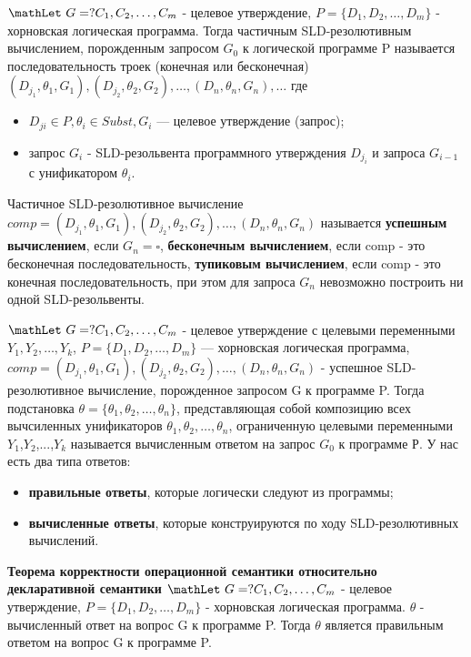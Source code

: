$\mathLet ~ G = ? C_{1},C_{2},\ldots,C_{m}$ - целевое утверждение, $P = \{D_{1},D_{2},\ldots,D_{m}\}$ - хорновская логическая программа. Тогда частичным SLD-резолютивным вычислением, порожденным запросом $G_{0}$ к логической программе P называется последовательность троек (конечная или бесконечная)\\
$(D_{j_{1}}, \theta_{1}, G_{1}), (D_{j_{2}}, \theta_{2}, G_{2}), \ldots, (D_{n}, \theta_{n}, G_{n}), \ldots$
где 
\begin{itemize}
    \item $D_{ji} \in P, \theta_{i} \in Subst, G_{i}$ — целевое утверждение (запрос);
    \item запрос $G_{i}$ - SLD-резольвента программного утверждения $D_{j_{i}}$ и запроса $G_{i-1}$ с унификатором $\theta_{i}$. 
\end{itemize}
Частичное SLD-резолютивное вычисление \\
$comp = (D_{j_{1}}, \theta_{1}, G_{1}), (D_{j_{2}}, \theta_{2}, G_{2}), \ldots, (D_{n}, \theta_{n}, G_{n})$ называется \textbf{успешным вычислением}, если $G_{n} =\square$, \textbf{бесконечным вычислением}, если comp - это бесконечная последовательность, \textbf{тупиковым вычислением}, если comp - это конечная последовательность, при этом для запроса $G_{n}$ невозможно построить ни одной SLD-резольвенты. 

$\mathLet ~ G = ? C_{1},C_{2},\ldots,C_{m}$ - целевое утверждение с целевыми переменными $Y_{1},Y_{2},\ldots,Y_{k}$, $P = \{D_{1},D_{2},\ldots,D_{m}\}$ --- хорновская логическая программа, $comp = (D_{j_{1}}, \theta_{1}, G_{1}), (D_{j_{2}}, \theta_{2}, G_{2}), \ldots, (D_{n}, \theta_{n}, G_{n})$ - успешное SLD-резолютивное вычисление, порожденное запросом G к программе P. Тогда подстановка $\theta = \{\theta_{1},\theta_{2},\ldots,\theta_{n}\}$, представляющая собой композицию всех вычсиленных унификаторов $\theta_{1},\theta_{2},\ldots,\theta_{n}$, ограниченную целевыми переменными $Y_{1}$,$Y_{2}$,...,$Y_{k}$ называется вычисленным ответом на запрос $G_{0}$ к программе Р. 
У нас есть два типа ответов: 
\begin{itemize}
    \item \textbf{правильные ответы}, которые логически следуют из программы;
    \item \textbf{вычисленные ответы}, которые конструируются по ходу SLD-резолютивных вычислений.
\end{itemize}

\textbf{Теорема корректности операционной семантики относительно декларативной семантики} $\mathLet ~ G = ? C_{1},C_{2},\ldots,C_{m}$ - целевое утверждение, $P = \{D_{1},D_{2},\ldots,D_{m}\}$ - хорновская логическая программа. $\theta$ - вычисленный ответ на вопрос G к программе P. Тогда $\theta$ является правильным ответом на вопрос G к программе P. 

